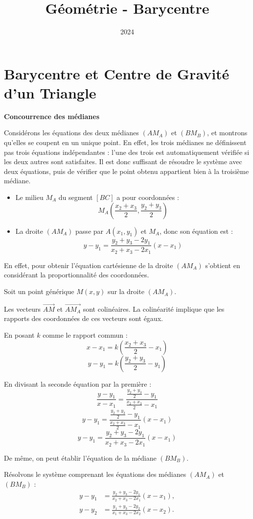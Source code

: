 \documentclass[10pt,a4paper]{article}
\title{Géométrie - Barycentre}
\author{}
\date{2024}
\begin{document}
\section{Barycentre et Centre de Gravité d'un Triangle}

\q \textbf{Concourrence des médianes}
\setcounter{ql}{0}

\ql Considérons les équations des deux médianes $(AM_A)$ et $(BM_B)$, et montrons qu'elles se
coupent en un unique point. En effet, les trois médianes ne définissent pas trois équations
indépendantes : l'une des trois est automatiquement vérifiée si les deux autres sont
satisfaites. Il est donc suffisant de résoudre le système avec deux équations, puis de vérifier que
le point obtenu appartient bien à la troisième médiane.

\begin{itemize}
    \item Le milieu $M_A$ du segment $[BC]$ a pour coordonnées :
    $$
    M_A \left( \frac{x_2 + x_3}{2}, \frac{y_2 + y_3}{2} \right)
    $$
    \item La droite $(AM_A)$ passe par $A(x_1, y_1)$ et $M_A$, donc son équation est :
    $$
    y - y_1 = \frac{y_2 + y_3 - 2y_1}{x_2 + x_3 - 2x_1} (x - x_1)
    $$
\end{itemize}
En effet, pour obtenir l'équation cartésienne de la droite $(AM_A)$ s'obtient en considérant la
proportionnalité des coordonnées.

Soit un point générique $M(x,y)$ sur la droite $(AM_A)$.

Les vecteurs $\overrightarrow{AM}$ et $\overrightarrow{AM_A}$ sont colinéaires.
La colinéarité implique que les rapports des coordonnées de ces vecteurs sont égaux.

En posant $k$ comme le rapport commun :
$$
x - x_1 = k(\frac{x_2 + x_3}{2} - x_1)
$$
$$
y - y_1 = k(\frac{y_2 + y_3}{2} - y_1)
$$

En divisant la seconde équation par la première :
$$
\frac{y - y_1}{x - x_1} = \frac{\frac{y_2 + y_3}{2} - y_1}{\frac{x_2 + x_3}{2} - x_1}
$$
$$
y - y_1 = \frac{\frac{y_2 + y_3}{2} - y_1}{\frac{x_2 + x_3}{2} - x_1}(x - x_1)
$$
$$
y - y_1 = \frac{y_2 + y_3 - 2y_1}{x_2 + x_3 - 2x_1}(x - x_1)
$$



De même, on peut établir l'équation de la médiane $(BM_B)$.

Résolvons le système comprenant les équations des médianes \((AM_A)\) et \((BM_B)\) :
\begin{align*}
y - y_1 &= \frac{y_2 + y_3 - 2y_1}{x_2 + x_3 - 2x_1} (x - x_1), \\
y - y_2 &= \frac{y_1 + y_3 - 2y_2}{x_1 + x_3 - 2x_2} (x - x_2).
\end{align*}
\end{document}
